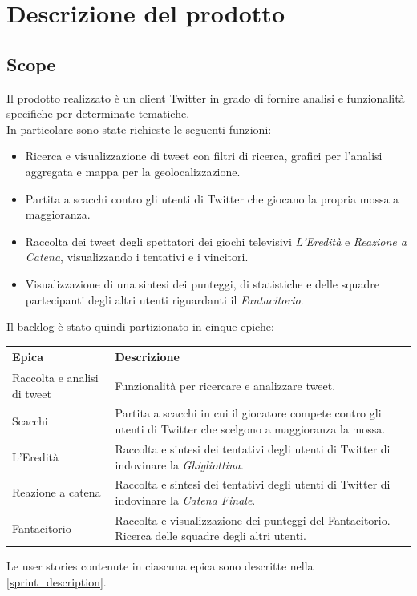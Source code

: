 \documentclass[11pt]{article}
\newcommand{\fref}[1]{\hyperref[#1]{\cref{#1}}}
\begin{document}
\tableofcontents
\newpage


\section{Descrizione del prodotto}
\subsection{Scope}
Il prodotto realizzato è un client Twitter in grado di fornire analisi e funzionalità specifiche per determinate tematiche.\\
In particolare sono state richieste le seguenti funzioni:
\begin{itemize}
    \item Ricerca e visualizzazione di tweet con filtri di ricerca, grafici per l'analisi aggregata e mappa per la geolocalizzazione.
    \item Partita a scacchi contro gli utenti di Twitter che giocano la propria mossa a maggioranza.
    \item Raccolta dei tweet degli spettatori dei giochi televisivi \textit{L'Eredità} e \textit{Reazione a Catena}, visualizzando i tentativi e i vincitori.
    \item Visualizzazione di una sintesi dei punteggi, di statistiche e delle squadre partecipanti degli altri utenti riguardanti il \textit{Fantacitorio}.
\end{itemize}

Il backlog è stato quindi partizionato in cinque epiche:
\begin{center}
    \begin{tabular}{ | m{8em} | m{11cm} | }
        \hline
        {\textbf{Epica}} & {\textbf{Descrizione}} \\
        \hline
        Raccolta e analisi di tweet & Funzionalità per ricercare e analizzare tweet. \\ 
        \hline
        Scacchi & Partita a scacchi in cui il giocatore compete contro gli utenti di Twitter che scelgono a maggioranza la mossa. \\ 
        \hline
        L'Eredità & Raccolta e sintesi dei tentativi degli utenti di Twitter di indovinare la \textit{Ghigliottina}. \\ 
        \hline
        Reazione a catena & Raccolta e sintesi dei tentativi degli utenti di Twitter di indovinare la \textit{Catena Finale}. \\ 
        \hline
        Fantacitorio & Raccolta e visualizzazione dei punteggi del Fantacitorio. Ricerca delle squadre degli altri utenti. \\ 
        \hline
    \end{tabular}
\end{center}
Le user stories contenute in ciascuna epica sono descritte nella \fref{sprint_description}.\\~\\
\end{document}
